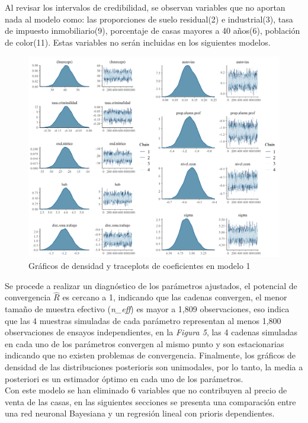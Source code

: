\documentclass[nojss]{jss}
\begin{document}
Al revisar los intervalos de credibilidad, se observan variables que no aportan nada al modelo como: las proporciones de suelo residual(2) e industrial(3), tasa de impuesto inmobiliario(9), porcentaje de casas mayores a 40 años(6), población de color(11). Estas variables no serán incluidas en los siguientes modelos.

\begin{figure}[H]
	\centering
	\includegraphics[scale=0.8]{images/traceplot1}
	\caption[trace1]{Gráficos de densidad y traceplots de coeficientes en modelo 1}
	\label{fig:fig5}
\end{figure}

Se procede a realizar un diagnóstico de los parámetros ajustados, el potencial de convergencia $\widehat{R}$ es cercano a 1, indicando que las cadenas convergen,  el menor tamaño de muestra efectivo (\textit{n\_eff}) es mayor a 1,809 observaciones, eso indica que las 4 muestras simuladas de cada parámetro representan al menos 1,800 observaciones de ensayos independientes, en la \textit{Figura 5}, las 4 cadenas simuladas en cada uno de los parámetros convergen al mismo punto y son estacionarias indicando que no existen problemas de convergencia. Finalmente, los gráficos de densidad de las distribuciones posterioris son unimodales, por lo tanto, la media a posteriori es un estimador óptimo en cada uno de los parámetros.\\

Con este modelo se han eliminado 6 variables que no contribuyen al precio de venta de las casas, en las siguientes secciones se presenta una comparación entre una red neuronal Bayesiana y un regresión lineal con prioris dependientes.\\
\end{document}
